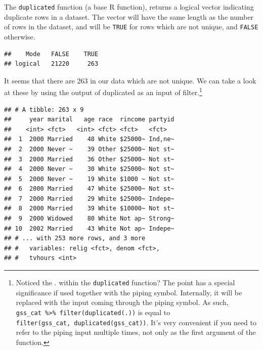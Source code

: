 \documentclass[]{tufte-book}
\newenvironment{Shaded}{}{}
\newcommand{\KeywordTok}[1]{\textcolor[rgb]{0.00,0.44,0.13}{\textbf{#1}}}
\newcommand{\StringTok}[1]{\textcolor[rgb]{0.25,0.44,0.63}{#1}}
\newcommand{\OperatorTok}[1]{\textcolor[rgb]{0.40,0.40,0.40}{#1}}
\newcommand{\NormalTok}[1]{#1}
\begin{document}
The \texttt{duplicated} function (a base R function), returns a logical
vector indicating duplicate rows in a dataset. The vector will have the
same length as the number of rows in the dataset, and will be
\texttt{TRUE} for rows which are not unique, and \texttt{FALSE}
otherwise.

\begin{Shaded}
\end{Shaded}

\begin{verbatim}
##    Mode   FALSE    TRUE 
## logical   21220     263
\end{verbatim}

It seems that there are 263 in our data which are not unique. We can
take a look at these by using the output of duplicated as an input of
filter.\footnote{Noticed the . within the \texttt{duplicated} function?
  The point has a special significance if used together with the piping
  symbol. Internally, it will be replaced with the input coming through
  the piping symbol. As such,
  \texttt{gss\_cat\ \%\textgreater{}\%\ filter(duplicated(.))} is equal
  to \texttt{filter(gss\_cat,\ duplicated(gss\_cat))}. It's very
  convenient if you need to refer to the piping input multiple times,
  not only as the first argument of the function.}

\begin{Shaded}
\end{Shaded}

\begin{verbatim}
## # A tibble: 263 x 9
##     year marital   age race  rincome partyid
##    <int> <fct>   <int> <fct> <fct>   <fct>  
##  1  2000 Married    48 White $25000~ Ind,ne~
##  2  2000 Never ~    39 Other $25000~ Not st~
##  3  2000 Married    36 Other $25000~ Not st~
##  4  2000 Never ~    30 White $25000~ Not st~
##  5  2000 Never ~    19 White $1000 ~ Not st~
##  6  2000 Married    47 White $25000~ Not st~
##  7  2000 Married    29 White $25000~ Indepe~
##  8  2000 Married    39 White $10000~ Not st~
##  9  2000 Widowed    80 White Not ap~ Strong~
## 10  2002 Married    43 White Not ap~ Indepe~
## # ... with 253 more rows, and 3 more
## #   variables: relig <fct>, denom <fct>,
## #   tvhours <int>
\end{verbatim}
\end{document}
